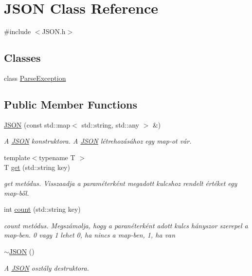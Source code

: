 \hypertarget{classJSON}{}\section{J\+S\+ON Class Reference}
\label{classJSON}


{\ttfamily \#include $<$J\+S\+O\+N.\+h$>$}

\subsection*{Classes}
\begin{DoxyCompactItemize}
\item 
class \hyperlink{classJSON_1_1ParseException}{Parse\+Exception}
\end{DoxyCompactItemize}
\subsection*{Public Member Functions}
\begin{DoxyCompactItemize}
\item 
\mbox{\label{classJSON_aba4f484f3ee84128f50ffd4d3b20ccf1}} 
\hyperlink{classJSON_aba4f484f3ee84128f50ffd4d3b20ccf1}{J\+S\+ON} (const std\+::map$<$ std\+::string, std\+::any $>$ \&)
\begin{DoxyCompactList}\small\item\em A \hyperlink{classJSON}{J\+S\+ON} konstruktora. A \hyperlink{classJSON}{J\+S\+ON} létrehozásához egy map-\/ot vár. \end{DoxyCompactList}\item 
\mbox{\label{classJSON_a6e05c25394240770da452ee6c13ed5bf}} 
{\footnotesize template$<$typename T $>$ }\\T \hyperlink{classJSON_a6e05c25394240770da452ee6c13ed5bf}{get} (std\+::string key)
\begin{DoxyCompactList}\small\item\em get metódus. Visszaadja a paraméterként megadott kulcshoz rendelt értéket egy map-\/ből. \end{DoxyCompactList}\item 
\mbox{\label{classJSON_a896544dd87ac36e8d8e4137f51ade9c2}} 
int \hyperlink{classJSON_a896544dd87ac36e8d8e4137f51ade9c2}{count} (std\+::string key)
\begin{DoxyCompactList}\small\item\em count metódus. Megszámolja, hogy a paranéterként adott kulcs hányszor szerepel a map-\/ben. 0 vagy 1 lehet 0, ha nincs a map-\/ben, 1, ha van \end{DoxyCompactList}\item 
\mbox{\label{classJSON_ad21d0848fcee452fe2434c653bc87510}} 
\hyperlink{classJSON_ad21d0848fcee452fe2434c653bc87510}{$\sim$\+J\+S\+ON} ()
\begin{DoxyCompactList}\small\item\em A \hyperlink{classJSON}{J\+S\+ON} osztály destruktora. \end{DoxyCompactList}\end{DoxyCompactItemize}
